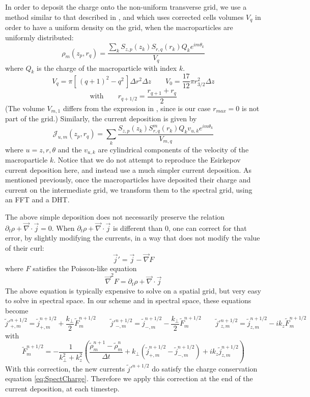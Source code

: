 \documentclass[a4paper]{article}   	%
\begin{document}
In order to deposit the charge onto the non-uniform
transverse grid, we use a method similar to that described in \cite{Verboncoeur},
and which uses corrected cells volumes $V_{q}$ in order to have a
uniform density on the grid, when the macroparticles are uniformly distributed:
\[ \mathcal{\rho}_m(z_p,r_q) = \frac{ \sum_k  S_{z,p}(z_k)S_{r,q}(r_k) Q_k e^{im\theta_k}}{V_{q}} \]
where $Q_k$ is the charge of the macroparticle with index $k$.
\[ V_{q} = \pi [\, (q+1)^2- q^2\,] \Delta r^2 \Delta z  \qquad
V_{0} = \frac{17}{12} \pi r_{3/2}^2 \Delta z \]
\[ \mathrm{with} \qquad r_{q+1/2} = \frac{r_{q+1} + r_q}{2}\]
(The volume $V_{m,1}$ differs from the expression in
\cite{Verboncoeur}, since is our case $r_{max}=0$ is not part of the grid.) Similarly, the current deposition is given by
\[ \mathcal{J}_{u,m}(z_p,r_q) = \sum_k  \frac{S_{z,p}(z_k) S^m_{r,q}(r_k)
Q_k v_{u,k} e^{im\theta_k}}{V_{m,q}} \]
where $u = z,r,\theta$ and the $v_{u,k}$ are cylindrical components of the
velocity of the macroparticle $k$. Notice that we do not attempt to
reproduce the Esirkepov current deposition here, and instead use a
much simpler current deposition. As mentioned previously, once the
macroparticles have deposited their charge and current on the
intermediate grid, we transform them to the spectral grid, using an
FFT and a DHT.

The above simple deposition does not necessarily
preserve the relation $\partial_t\rho + \vec{\nabla}\cdot\vec{j} =
0$. When $\partial_t\rho + \vec{\nabla}\cdot\vec{j}$ is different than 0,
one can correct for that error, by slightly modifying the currents, in
a way that does not modify the value of their curl:
\[ \vec{j}' = \vec{j} - \vec{\nabla} F \]
where $F$ satisfies the Poisson-like equation
\[ \vec{\nabla}^2 F = \partial_t\rho + \vec{\nabla}\cdot\vec{j} \]
The above equation is typically expensive to solve on a spatial grid, but
very easy to solve in spectral space. In our scheme and in spectral
space, these equations become
\[ \tilde{j}'^{n+1/2}_{+,m} = \tilde{j}^{n+1/2}_{+,m} +
\frac{k_\perp}{2} \tilde{F}^{n+1/2}_m
\qquad
\tilde{j}'^{n+1/2}_{-,m} = \tilde{j}^{n+1/2}_{-,m} - \frac{k_\perp}{2} \tilde{F}^{n+1/2}_m
\qquad \tilde{j}'^{n+1/2}_{z,m} = \tilde{j}^{n+1/2}_{z,m} - ik_z
\tilde{F}^{n+1/2}_m\]
with
\[ \tilde{F}^{n+1/2}_m = - \frac{1}{k_\perp^2 + k_z^2}\left(
  \frac{\tilde{\rho}^{n+1}_m -\tilde{\rho}^{n}_m}{\Delta t} + k_\perp
  (\tilde{j}^{n+1/2}_{+,m} -\tilde{j}^{n+1/2}_{-,m}) + ik_z\tilde{j}^{n+1/2}_{z,m}  \right) \]
With this correction, the new currents $\tilde{j}'^{n+1/2}$ do satisfy
the charge conservation equation \cref{eq:SpectCharge}. Therefore we apply this
correction at the end of the current deposition, at each timestep.
\end{document}

